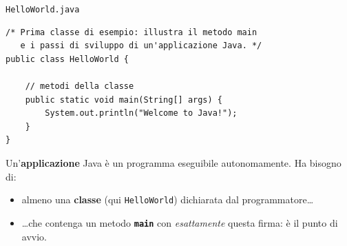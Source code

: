 \documentclass[10pt,aspectratio=169]{beamer}
\begin{document}
\begin{frame}[fragile]{\texttt{HelloWorld.java}}
\begin{lstlisting}
/* Prima classe di esempio: illustra il metodo main
   e i passi di sviluppo di un'applicazione Java. */
public class HelloWorld {

    // metodi della classe
    public static void main(String[] args) {
        System.out.println("Welcome to Java!");
    }
}
\end{lstlisting}

\vspace{0.2cm}
Un'\textbf{applicazione} Java è un programma eseguibile autonomamente. Ha bisogno di:
\begin{itemize}\itemsep=0pt
    \item almeno una \textbf{classe} (qui \texttt{HelloWorld}) dichiarata dal programmatore\ldots
    \item \ldots che contenga un metodo \textbf{\texttt{main}} con \emph{esattamente} questa firma: è il punto di avvio.
\end{itemize}
\end{frame}
\end{document}
